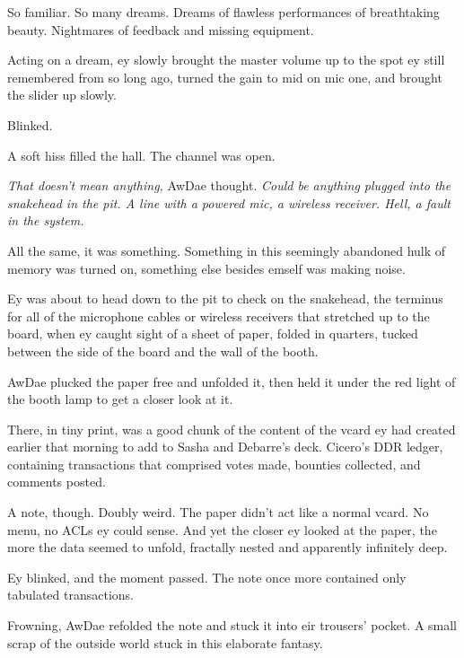 So familiar. So many dreams. Dreams of flawless performances of breathtaking beauty. Nightmares of feedback and missing equipment.

Acting on a dream, ey slowly brought the master volume up to the spot ey still remembered from so long ago, turned the gain to mid on mic one, and brought the slider up slowly.

Blinked.

A soft hiss filled the hall. The channel was open.

\emph{That doesn't mean anything,} AwDae thought. \emph{Could be anything plugged into the snakehead in the pit. A line with a powered mic, a wireless receiver. Hell, a fault in the system.}

All the same, it was something. Something in this seemingly abandoned hulk of memory was turned on, something else besides emself was making noise.

Ey was about to head down to the pit to check on the snakehead, the terminus for all of the microphone cables or wireless receivers that stretched up to the board, when ey caught sight of a sheet of paper, folded in quarters, tucked between the side of the board and the wall of the booth.

AwDae plucked the paper free and unfolded it, then held it under the red light of the booth lamp to get a closer look at it.

There, in tiny print, was a good chunk of the content of the vcard ey had created earlier that morning to add to Sasha and Debarre's deck. Cicero's DDR ledger, containing transactions that comprised votes made, bounties collected, and comments posted.

A note, though. Doubly weird. The paper didn't act like a normal vcard. No menu, no ACLs ey could sense. And yet the closer ey looked at the paper, the more the data seemed to unfold, fractally nested and apparently infinitely deep.

Ey blinked, and the moment passed. The note once more contained only tabulated transactions.

Frowning, AwDae refolded the note and stuck it into eir trousers' pocket. A small scrap of the outside world stuck in this elaborate fantasy.
